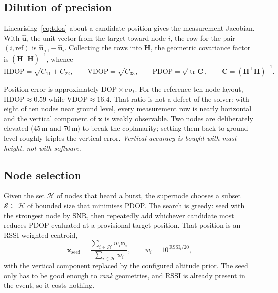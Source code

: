 \documentclass[11pt,a4paper]{article}
\newcommand{\uvec}[1]{\hat{\mathbf{#1}}}
\begin{document}
\subsection{Dilution of precision}
\label{sec:gdop}

Linearising~\eqref{eq:tdoa} about a candidate position gives the measurement
Jacobian. With $\uvec{u}_i$ the unit vector from the target toward node $i$,
the row for the pair $(i,\text{ref})$ is $\uvec{u}_{\text{ref}}-\uvec{u}_i$.
Collecting the rows into $\mathbf{H}$, the geometric covariance factor is
$(\mathbf{H}^\top\mathbf{H})^{-1}$, whence
\begin{equation}
  \text{HDOP}=\sqrt{C_{11}+C_{22}},\qquad
  \text{VDOP}=\sqrt{C_{33}},\qquad
  \text{PDOP}=\sqrt{\operatorname{tr}\mathbf{C}},
  \qquad \mathbf{C}=(\mathbf{H}^\top\mathbf{H})^{-1}.
\end{equation}

Position error is approximately $\text{DOP}\times c\,\sigma_t$. For the
reference ten-node layout, $\text{HDOP}\approx0.59$ while
$\text{VDOP}\approx16.4$. That ratio is not a defect of the solver: with
eight of ten nodes near ground level, every measurement row is nearly
horizontal and the vertical component of $\mathbf{x}$ is weakly observable.
Two nodes are deliberately elevated ($45$\,m and $70$\,m) to break the
coplanarity; setting them back to ground level roughly triples the vertical
error. \emph{Vertical accuracy is bought with mast height, not with
software.}

\subsection{Node selection}

Given the set $\mathcal{H}$ of nodes that heard a burst, the supernode
chooses a subset $\mathcal{S}\subseteq\mathcal{H}$ of bounded size that
minimises PDOP. The search is greedy: seed with the strongest node by SNR,
then repeatedly add whichever candidate most reduces PDOP evaluated at a
provisional target position. That position is an RSSI-weighted centroid,
\begin{equation}
  \mathbf{x}_{\text{seed}}
  = \frac{\sum_{i\in\mathcal{H}} w_i \mathbf{n}_i}{\sum_{i\in\mathcal{H}} w_i},
  \qquad w_i = 10^{\,\text{RSSI}_i/20},
\end{equation}
with the vertical component replaced by the configured altitude prior. The
seed only has to be good enough to \emph{rank} geometries, and RSSI is
already present in the event, so it costs nothing.
\end{document}
